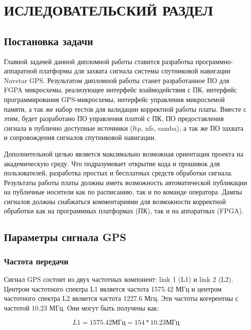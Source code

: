 \section{ИСЛЕДОВАТЕЛЬСКИЙ РАЗДЕЛ}

\subsection{Постановка задачи}
Главной задачей данной дипломной работы ставится разработка программно-аппаратной платформы для захвата сигнала системы спутниковой 
навигации Navstar GPS. Результатом дипломной работы станет разработанное ПО для FGPA микросхемы, реализующее интерфейс взаймодействия с ПК,
интерфейс программирования GPS-микросхемы, интерфейс управления микросхемой памяти, а так же набор тестов для валидации корректной работы
платы. Вместе с этим, будет разработано ПО управления платой с ПК, ПО предоставления сигнала в публично доступные источники
(ftp, nfs, samba), а так же ПО захвата и сопровождения сигналов спутниковой навигации. 

Дополнительной целью является максимально возможная ориентация проекта на академическую среду. Что подразумевает открытие кода и прошивок
для пользователей, разработка простых и бесплатных средств обработки сигнала. Результаты работы платы должны иметь возможность
автоматической публикации на публичные носители как по расписанию, так и по команде оператора. Дампы сигналов должны снабжаться
комментариями для возможности корректной обработки как на программных платформах (ПК), так и на аппаратных (FPGA).

\subsection{Параметры сигнала GPS}
\label{razdel11}
\subsubsection{Частота передачи}
Сигнал GPS состоит из двух частотных компонент: link 1 (L1) и link 2 (L2). Центром частотного спектра L1 является
частота 1575.42 МГц и центром частотного спектра L2 является частота 1227.6 Мгц. Эти частоты когерентны с
частотой 10.23 МГц. Они могут быть получены как:

\begin{equation}
L1=1575.42\mbox{МГц}=154*10.23\mbox{МГц}
\label{eq:l1_freq}
\end{equation}

